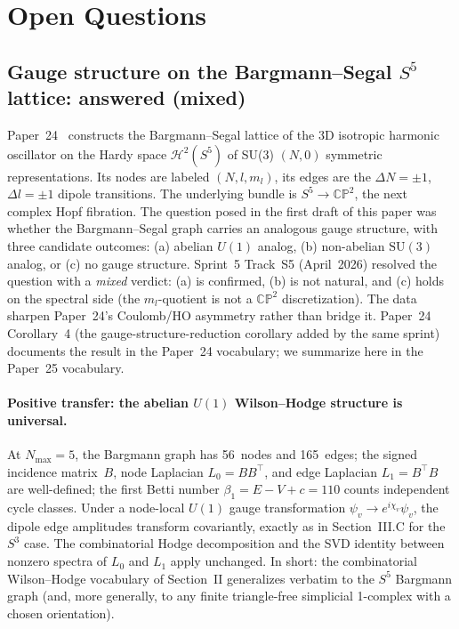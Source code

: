 \documentclass[aps,pra,twocolumn,superscriptaddress,longbibliography]{revtex4-2}
\begin{document}
\section{Open Questions}
\label{sec:open}

\subsection{Gauge structure on the Bargmann--Segal $S^5$ lattice: answered (mixed)}
\label{sec:s5_bargmann_open}

Paper~24~\cite{Paper24} constructs the Bargmann--Segal lattice
of the 3D isotropic harmonic oscillator on the Hardy space
$\mathcal{H}^2(S^5)$ of SU(3) $(N, 0)$ symmetric representations.
Its nodes are labeled $(N, l, m_l)$, its edges are the
$\Delta N = \pm 1$, $\Delta l = \pm 1$ dipole transitions.  The
underlying bundle is $S^5 \to \mathbb{CP}^2$, the next complex Hopf
fibration.  The question posed in the first draft of this paper was
whether the Bargmann--Segal graph carries an analogous gauge
structure, with three candidate outcomes: (a) abelian $U(1)$ analog,
(b) non-abelian $\mathrm{SU}(3)$ analog, or (c) no gauge structure.
Sprint~5 Track~S5 (April~2026) resolved the question with a
\emph{mixed} verdict: (a) is confirmed, (b) is not natural, and (c)
holds on the spectral side (the $m_l$-quotient is not a
$\mathbb{CP}^2$ discretization).  The data sharpen Paper~24's
Coulomb/HO asymmetry rather than bridge it.  Paper~24
Corollary~4 (the gauge-structure-reduction corollary added by the
same sprint) documents the result in the Paper~24 vocabulary; we
summarize here in the Paper~25 vocabulary.

\paragraph*{Positive transfer: the abelian $U(1)$ Wilson--Hodge
structure is universal.} At $N_{\max} = 5$, the Bargmann graph has
56~nodes and 165~edges; the signed incidence matrix~$B$, node
Laplacian $L_0 = B B^{\top}$, and edge Laplacian
$L_1 = B^{\top} B$ are well-defined; the first Betti number
$\beta_1 = E - V + c = 110$ counts independent cycle
classes.  Under a node-local $U(1)$ gauge transformation
$\psi_v \to e^{i\chi_v}\psi_v$, the dipole edge amplitudes transform
covariantly, exactly as in Section~III.C for the $S^3$ case.  The
combinatorial Hodge decomposition and the SVD identity between
nonzero spectra of $L_0$ and $L_1$ apply unchanged.  In short: the
combinatorial Wilson--Hodge vocabulary of Section~II generalizes
verbatim to the $S^5$ Bargmann graph (and, more generally, to any
finite triangle-free simplicial 1-complex with a chosen orientation).
\end{document}
